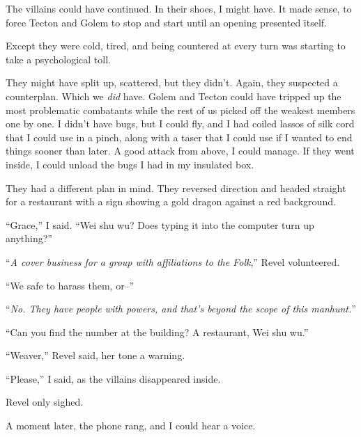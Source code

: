 The villains could have continued.  In their shoes, I might have.  It made sense, to force Tecton and Golem to stop and start until an opening presented itself.



Except they were cold, tired, and being countered at every turn was starting to take a psychological toll.



They might have split up, scattered, but they didn't.  Again, they suspected a counterplan.  Which we \emph{did} have.  Golem and Tecton could have tripped up the most problematic combatants while the rest of us picked off the weakest members one by one.  I didn't have bugs, but I could fly, and I had coiled lassos of silk cord that I could use in a pinch, along with a taser that I could use if I wanted to end things sooner than later.  A good attack from above, I could manage.  If they went inside, I could unload the bugs I had in my insulated box.



They had a different plan in mind.  They reversed direction and headed straight for a restaurant with a sign showing a gold dragon against a red background.



``Grace,'' I said.  ``Wei shu wu?  Does typing it into the computer turn up anything?''



``\emph{A cover business for a group with affiliations to the Folk},'' Revel volunteered.



``We safe to harass them, or--''



``\emph{No.  They have people with powers, and that's beyond the scope of this manhunt.}''



``Can you find the number at the building?  A restaurant, Wei shu wu.''



``Weaver,'' Revel said, her tone a warning.



``Please,'' I said, as the villains disappeared inside.



Revel only sighed.



A moment later, the phone rang, and I could hear a voice.



